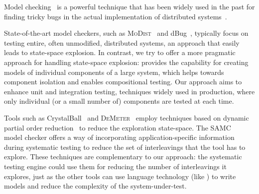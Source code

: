 Model checking~\cite{godefroid1997verisoft} is a powerful technique that has been widely used in the past for finding tricky bugs in the actual implementation of distributed systems~\cite{killian2007life, yang2009modist, yabandeh2009crystalball, guerraoui2011model, guo2011practical, simsa2011dbug, leesatapornwongsa2014samc}. 

State-of-the-art model checkers, such as \textsc{MoDist}~\cite{yang2009modist} and dBug~\cite{simsa2011dbug}, typically focus on testing entire, often unmodified, distributed systems, an approach that easily leads to state-space explosion. In contrast, we try to offer a more pragmatic approach for handling state-space explosion: \psharp provides the capability for creating models of individual components of a large system, which helps towards component isolation and enables compositional testing. Our approach aims to enhance unit and integration testing, techniques widely used in production, where only individual (or a small number of) components are tested at each time.

Tools such as CrystalBall~\cite{yabandeh2009crystalball} and \textsc{DeMeter}~\cite{guo2011practical} employ techniques based on dynamic partial order reduction~\cite{lauterburg2010evaluating} to reduce the exploration state-space. The SAMC~\cite{leesatapornwongsa2014samc} model checker offers a way of incorporating application-specific information during systematic testing to reduce the set of interleavings that the tool has to explore. These techniques are complementary to our approach: the \psharp systematic testing engine could use them for reducing the number of interleavings it explores, just as the other tools can use language technology (like \psharp) to write models and reduce the complexity of the system-under-test. 




